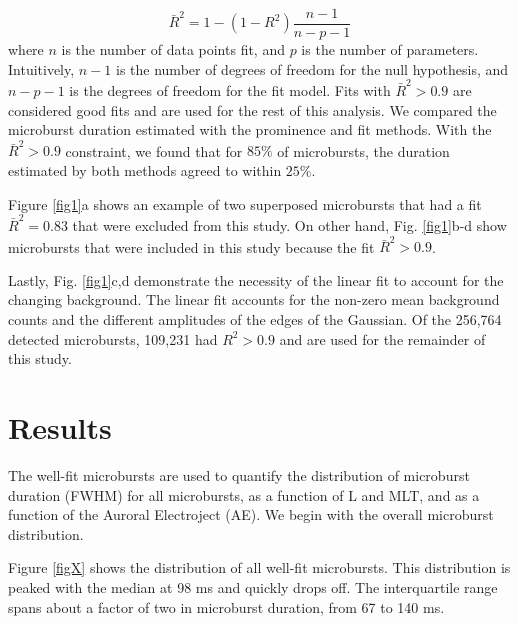\documentclass[draft]{agujournal2019}
\begin{document}
\begin{equation}
\bar{R}^2 = 1 - (1-R^2) \frac{n-1}{n-p-1}
\end{equation} where $n$ is the number of data points fit, and $p$ is the number of parameters. Intuitively, $n-1$ is the number of degrees of freedom for the null hypothesis, and $n-p-1$ is the degrees of freedom for the fit model. Fits with $\bar{R}^2 > 0.9$ are considered good fits and are used for the rest of this analysis. We compared the microburst duration estimated with the prominence and fit methods. With the $\bar{R}^2 > 0.9$ constraint, we found that for $85\%$ of microbursts, the duration estimated by both methods agreed to within $25\%$.

Figure \ref{fig1}a shows an example of two superposed microbursts that had a fit $\bar{R}^2 = 0.83$ that were excluded from this study. On other hand, Fig. \ref{fig1}b-d show microbursts that were included in this study because the fit $\bar{R}^2 > 0.9$.

Lastly, Fig. \ref{fig1}c,d demonstrate the necessity of the linear fit to account for the changing background. The linear fit accounts for the non-zero mean background counts and the different amplitudes of the edges of the Gaussian. Of the 256,764 detected microbursts, 109,231 had $R^2 > 0.9$ and are used for the remainder of this study.

\section{Results}\label{results}
The well-fit microbursts are used to quantify the distribution of microburst duration (FWHM) for all microbursts, as a function of L and MLT, and as a function of the Auroral Electroject (AE). We begin with the overall microburst distribution.

Figure \ref{figX} shows the distribution of all well-fit microbursts. This distribution is peaked with the median at 98 ms and quickly drops off. The interquartile range spans about a factor of two in microburst duration, from 67 to 140 ms. 
\end{document}

